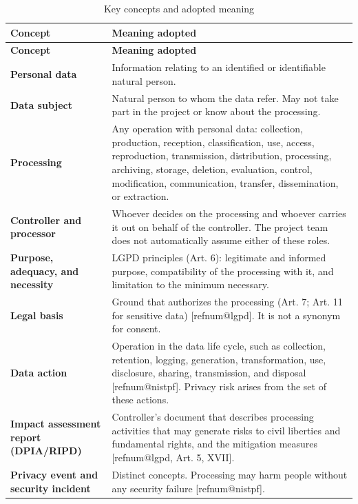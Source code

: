 \documentclass[11pt,a4paper]{article}
\makeatletter
\newcommand{\refnum}[1]{\csname refnum@#1\endcsname}
\newcommand{\cit}[1]{[\refnum{#1}]}
\newcommand{\SingleSpacing}{}
\newcommand{\fontetab}[1]{\par\vspace{3pt}{\small\noindent Source: #1\par}}
\makeatother
\begin{document}
\begingroup\SingleSpacing\small
\begin{longtable}{@{}>{\raggedright\arraybackslash}p{}>{\raggedright\arraybackslash}p{}@{}}
\caption{Key concepts and adopted meaning}\label{tab:t2}\\
\toprule
\textbf{Concept} & \textbf{Meaning adopted}\\
\midrule
\endfirsthead
\toprule
\textbf{Concept} & \textbf{Meaning adopted}\\
\midrule
\endhead
\bottomrule
\endfoot
\bottomrule
\endlastfoot
\textbf{Personal data} & Information relating to an identified or identifiable natural person.\\[3pt]
\textbf{Data subject} & Natural person to whom the data refer. May not take part in the project or know about the processing.\\[3pt]
\textbf{Processing} & Any operation with personal data: collection, production, reception, classification, use, access, reproduction, transmission, distribution, processing, archiving, storage, deletion, evaluation, control, modification, communication, transfer, dissemination, or extraction.\\[3pt]
\textbf{Controller and processor} & Whoever decides on the processing and whoever carries it out on behalf of the controller. The project team does not automatically assume either of these roles.\\[3pt]
\textbf{Purpose, adequacy, and necessity} & LGPD principles (Art. 6): legitimate and informed purpose, compatibility of the processing with it, and limitation to the minimum necessary.\\[3pt]
\textbf{Legal basis} & Ground that authorizes the processing (Art. 7; Art. 11 for sensitive data) [\refnum{lgpd}]. It is not a synonym for consent.\\[3pt]
\textbf{Data action} & Operation in the data life cycle, such as collection, retention, logging, generation, transformation, use, disclosure, sharing, transmission, and disposal [\refnum{nistpf}]. Privacy risk arises from the set of these actions.\\[3pt]
\textbf{Impact assessment report (DPIA/RIPD)} & Controller's document that describes processing activities that may generate risks to civil liberties and fundamental rights, and the mitigation measures [\refnum{lgpd}, Art. 5, XVII].\\[3pt]
\textbf{Privacy event and security incident} & Distinct concepts. Processing may harm people without any security failure [\refnum{nistpf}].\\[3pt]
\end{longtable}
\endgroup
\fontetab{Prepared by the authors (2026), based on \cit{lgpd} and \cit{nistpf}.}
\end{document}
